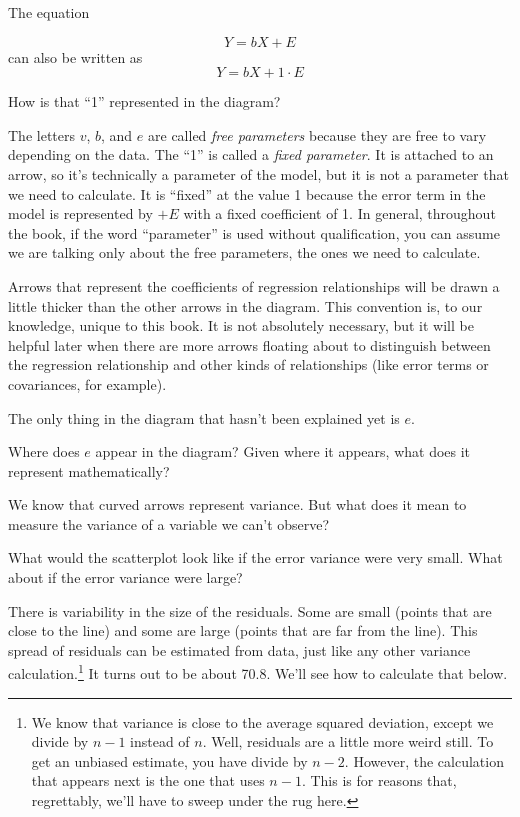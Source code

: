\documentclass[
]{book}
\begin{document}
The equation

\[
Y = bX + E
\]
can also be written as
\[
Y = bX + 1 \cdot E
\]

How is that ``1'' represented in the diagram?

The letters \(v\), \(b\), and \(e\) are called \emph{free parameters} because they are free to vary depending on the data. The ``1'' is called a \emph{fixed parameter}. It is attached to an arrow, so it's technically a parameter of the model, but it is not a parameter that we need to calculate. It is ``fixed'' at the value 1 because the error term in the model is represented by \(+E\) with a fixed coefficient of 1. In general, throughout the book, if the word ``parameter'' is used without qualification, you can assume we are talking only about the free parameters, the ones we need to calculate.

Arrows that represent the coefficients of regression relationships will be drawn a little thicker than the other arrows in the diagram. This convention is, to our knowledge, unique to this book. It is not absolutely necessary, but it will be helpful later when there are more arrows floating about to distinguish between the regression relationship and other kinds of relationships (like error terms or covariances, for example).

The only thing in the diagram that hasn't been explained yet is \(e\).

Where does \(e\) appear in the diagram? Given where it appears, what does it represent mathematically?

We know that curved arrows represent variance. But what does it mean to measure the variance of a variable we can't observe?

What would the scatterplot look like if the error variance were very small. What about if the error variance were large?

There is variability in the size of the residuals. Some are small (points that are close to the line) and some are large (points that are far from the line). This spread of residuals can be estimated from data, just like any other variance calculation.\footnote{We know that variance is close to the average squared deviation, except we divide by \(n - 1\) instead of \(n\). Well, residuals are a little more weird still. To get an unbiased estimate, you have divide by \(n - 2\). However, the calculation that appears next is the one that uses \(n - 1\). This is for reasons that, regrettably, we'll have to sweep under the rug here.} It turns out to be about 70.8. We'll see how to calculate that below.
\end{document}
